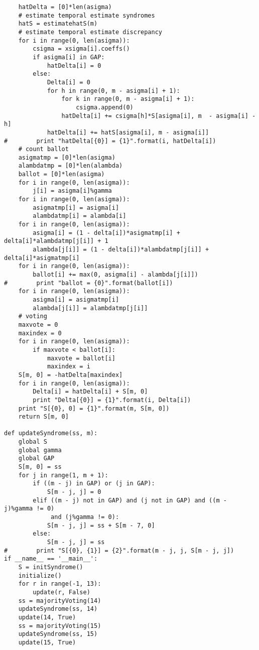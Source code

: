 \documentclass[12pt]{jarticle}
\theoremstyle{break}
\begin{document}
\begin{verbatim}
    hatDelta = [0]*len(asigma)
    # estimate temporal estimate syndromes
    hatS = estimatehatS(m)
    # estimate temporal estimate discrepancy
    for i in range(0, len(asigma)):
        csigma = xsigma[i].coeffs()
        if asigma[i] in GAP:
            hatDelta[i] = 0
        else:
            Delta[i] = 0
            for h in range(0, m - asigma[i] + 1):
                for k in range(0, m - asigma[i] + 1):
                    csigma.append(0)
                hatDelta[i] += csigma[h]*S[asigma[i], m  - asigma[i] - h] 
            hatDelta[i] += hatS[asigma[i], m - asigma[i]]
#        print "hatDelta[{0}] = {1}".format(i, hatDelta[i])
    # count ballot
    asigmatmp = [0]*len(asigma)
    alambdatmp = [0]*len(alambda)
    ballot = [0]*len(asigma)
    for i in range(0, len(asigma)):
        j[i] = asigma[i]%gamma
    for i in range(0, len(asigma)):
        asigmatmp[i] = asigma[i]
        alambdatmp[i] = alambda[i]
    for i in range(0, len(asigma)):
        asigma[i] = (1 - delta[i])*asigmatmp[i] + delta[i]*alambdatmp[j[i]] + 1
        alambda[j[i]] = (1 - delta[i])*alambdatmp[j[i]] + delta[i]*asigmatmp[i]
    for i in range(0, len(asigma)):
        ballot[i] += max(0, asigma[i] - alambda[j[i]])
#        print "ballot = {0}".format(ballot[i])
    for i in range(0, len(asigma)):
        asigma[i] = asigmatmp[i]
        alambda[j[i]] = alambdatmp[j[i]]
    # voting
    maxvote = 0
    maxindex = 0
    for i in range(0, len(asigma)):
        if maxvote < ballot[i]:
            maxvote = ballot[i]
            maxindex = i
    S[m, 0] = -hatDelta[maxindex]
    for i in range(0, len(asigma)):
        Delta[i] = hatDelta[i] + S[m, 0]
        print "Delta[{0}] = {1}".format(i, Delta[i])
    print "S[{0}, 0] = {1}".format(m, S[m, 0])
    return S[m, 0]
    
def updateSyndrome(ss, m):
    global S
    global gamma
    global GAP
    S[m, 0] = ss
    for j in range(1, m + 1):
        if ((m - j) in GAP) or (j in GAP):
            S[m - j, j] = 0
        elif ((m - j) not in GAP) and (j not in GAP) and ((m - j)%gamma != 0)
       		 and (j%gamma != 0):
            S[m - j, j] = ss + S[m - 7, 0]
        else:
            S[m - j, j] = ss
#        print "S[{0}, {1}] = {2}".format(m - j, j, S[m - j, j])
if __name__ == '__main__':
    S = initSyndrome()
    initialize()
    for r in range(-1, 13):
        update(r, False)
    ss = majorityVoting(14)
    updateSyndrome(ss, 14)
    update(14, True)
    ss = majorityVoting(15)
    updateSyndrome(ss, 15)
    update(15, True)
\end{verbatim}
\end{document}
